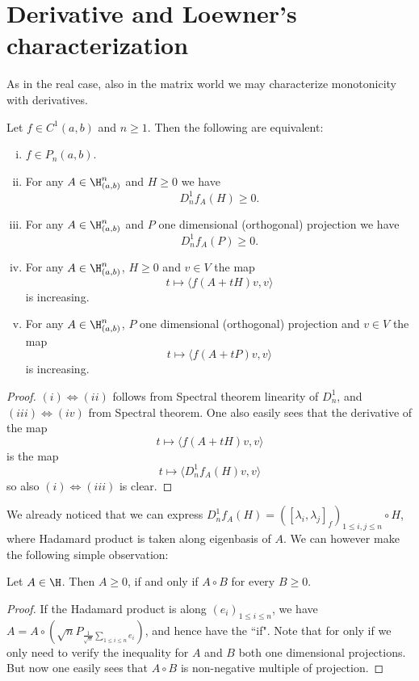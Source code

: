 \section{Derivative and Loewner's characterization}

As in the real case, also in the matrix world we may characterize monotonicity with derivatives.

\begin{lause}\label{monotone_derivative}
	Let $f \in C^{1}(a, b)$ and $n \geq 1$. Then the following are equivalent:
	\begin{enumerate}[(i)]
	\item $f \in P_{n}(a, b)$.
	\item For any $A \in \H^{n}_{(a, b)}$ and $H \geq 0$ we have
	\[
		D^{1}_{n}f_{A}(H) \geq 0.
	\]
	\item For any $A \in \H^{n}_{(a, b)}$ and $P$ one dimensional (orthogonal) projection we have
	\[
		D^{1}_{n}f_{A}(P) \geq 0.
	\]
	\item For any $A \in \H^{n}_{(a, b)}$, $H \geq 0$ and $v \in V$ the map
	\[
		t \mapsto \langle f(A + t H) v, v \rangle
	\]
	is increasing.
	\item For any $A \in \H^{n}_{(a, b)}$, $P$ one dimensional (orthogonal) projection and $v \in V$ the map
	\[
		t \mapsto \langle f(A + t P) v, v \rangle
	\]
	is increasing.
	\end{enumerate}
\end{lause}
\begin{proof}
	$(i) \Leftrightarrow (ii)$ follows from Spectral theorem linearity of $D^{1}_{n}$, and $(iii) \Leftrightarrow (iv)$ from Spectral theorem. One also easily sees that the derivative of the map
	\[
		t \mapsto \langle f(A + t H) v, v \rangle
	\]
	is the map
	\[
		t \mapsto \langle D^{1}_{n}f_{A}(H) v, v \rangle
	\]
	so also $(i) \Leftrightarrow (iii)$ is clear.
\end{proof}

We already noticed that we can express $D^{1}_{n}f_{A}(H) = ([\lambda_{i}, \lambda_{j}]_{f})_{1 \leq i, j \leq n}\circ H$, where Hadamard product is taken along eigenbasis of $A$. We can however make the following simple observation:

\begin{lem}
	Let $A \in \H$. Then $A \geq 0$, if and only if $A \circ B$ for every $B \geq 0$.
\end{lem}

\begin{proof}
	If the Hadamard product is along $(e_{i})_{1 \leq i \leq n}$, we have $A = A \circ \left(\sqrt{n} P_{\frac{1}{\sqrt{n}}\sum_{1 \leq i \leq n} e_{i}} \right)$, and hence have the ``if". Note that for only if we only need to verify the inequality for $A$ and $B$ both one dimensional projections. But now one easily sees that $A \circ B$ is non-negative multiple of projection.
\end{proof}

